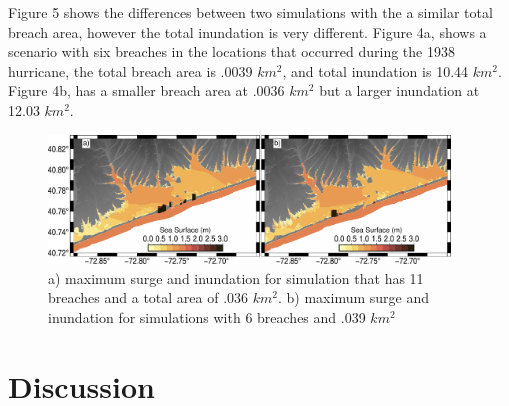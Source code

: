 \documentclass{coastal_paper}
\begin{document}
Figure 5 shows the differences between two simulations with the a similar total breach area, however the total inundation is very different. Figure 4a, shows a scenario with six breaches in the locations that occurred during the 1938 hurricane, the total breach area is .0039 $km^2$, and total inundation is 10.44 $km^2$. Figure 4b, has a smaller breach area at .0036 $km^2$ but a larger inundation at 12.03 $km^2$.


\begin{figure}
    \centering
    \includegraphics[width=0.95\textwidth]{6_vs_11_breaches.pdf}
    \caption{a) maximum surge and inundation for simulation that has 11 breaches and a total area of .036 $km^2$. b) maximum surge and inundation for simulations with 6 breaches and .039 $km^2$}
    \label{fig5}
\end{figure}





\section{Discussion}
\end{document}

